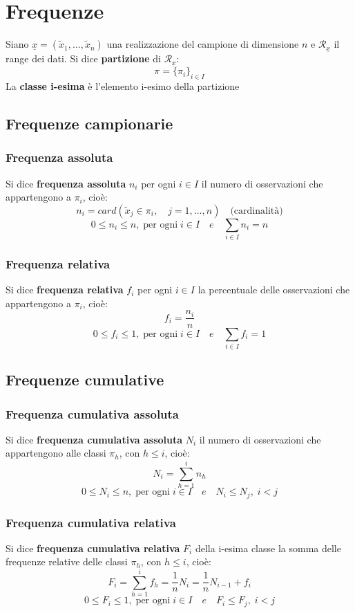 \documentclass[a4paper]{article}
\theoremstyle{break}
\theoremstyle{break}
\theoremstyle{break}
\theoremstyle{break}
\begin{document}
\section{Frequenze}
Siano \( \underline{x} = (\tilde{x}_1, \ldots, \tilde{x}_n) \) una realizzazione del
campione di dimensione \( n \) e \( \mathcal{R}_{\underline{x}} \) il range dei dati.
Si dice \textbf{partizione} di \( \mathcal{R}_{\underline{x}} \):
\[
  \pi = \{\pi_i\}_{i \in I}
\] 
La \textbf{classe i-esima} è l'elemento i-esimo della partizione

\subsection{Frequenze campionarie}
\subsubsection{Frequenza assoluta}
Si dice \textbf{frequenza assoluta} \( n_i \) per ogni \( i \in I \) il numero di
osservazioni che appartengono a \( \pi_i  \), cioè:
\[
  n_i = card(\tilde{x}_j \in \pi_i, \quad j = 1, \ldots, n) \quad \text{(cardinalità)}
\] 
\[
  0 \le n_i \le n, \; \text{per ogni}\; i \in I \quad e \quad \sum_{i \in I} n_i = n
\] 

\subsubsection{Frequenza relativa}
Si dice \textbf{frequenza relativa} \( f_i \) per ogni \( i \in I \) la percentuale delle
osservazioni che appartengono a \( \pi _i \), cioè:
\[
  f_i = \frac{n_i}{n}
\]
\[
  0 \le f_i \le 1, \; \text{per ogni}\; i \in I \quad e \quad \sum_{i \in I} f_i = 1
\] 

\subsection{Frequenze cumulative}
\subsubsection{Frequenza cumulativa assoluta}
Si dice \textbf{frequenza cumulativa assoluta} \( N_i \) il numero di osservazioni che
appartengono alle classi \( \pi_h \), con \( h \le i \), cioè:
\[
  N_i = \sum_{h=1}^{i} n_h
\] 
\[
  0 \le N_i \le n, \; \text{per ogni}\; i \in I \quad e \quad N_i \le N_j, \; i<j
\] 

\subsubsection{Frequenza cumulativa relativa}
Si dice \textbf{frequenza cumulativa relativa} \( F_i \) della i-esima classe la somma
delle frequenze relative delle classi \( \pi _h \), con \( h \le i \), cioè:
\[
  F_i = \sum_{h=1}^{i} f_h = \frac{1}{n}N_i = \frac{1}{n}N_{i-1} + f_i
\] 
\[
  0 \le F_i \le 1, \; \text{per ogni}\; i \in I \quad e \quad F_i \le F_j, \; i<j
\] 
\end{document}
